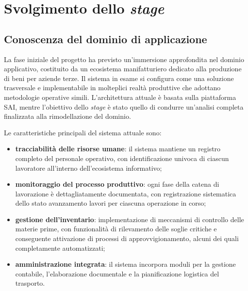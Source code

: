 \chapter{Svolgimento dello \textit{stage}}
    \section{Conoscenza del dominio di applicazione}
    La fase iniziale del progetto ha previsto un'immersione approfondita nel dominio applicativo, costituito da un ecosistema manifatturiero dedicato alla produzione di beni per aziende terze. Il sistema in esame si configura come una soluzione trasversale e implementabile in molteplici realtà produttive che adottano metodologie operative simili. L'architettura attuale è basata sulla piattaforma SAI, mentre l'obiettivo dello \textit{stage} è stato quello di condurre un'analisi completa finalizzata alla rimodellazione del dominio.

    \vspace{0.2 em}
    \noindent Le caratteristiche principali del sistema attuale sono:

    \begin{itemize}
        \item \textbf{tracciabilità delle risorse umane}: il sistema mantiene un registro completo del personale operativo, con identificazione univoca di ciascun lavoratore all'interno dell'ecosistema informativo;

        \item \textbf{monitoraggio del processo produttivo}: ogni fase della catena di lavorazione è dettagliatamente documentata, con registrazione sistematica dello stato avanzamento lavori per ciascuna operazione in corso;

        \item \textbf{gestione dell'inventario}: implementazione di meccanismi di controllo delle materie prime, con funzionalità di rilevamento delle soglie critiche e conseguente attivazione di processi di approvvigionamento, alcuni dei quali completamente automatizzati;

        \item \textbf{amministrazione integrata}: il sistema incorpora moduli per la gestione contabile, l'elaborazione documentale e la pianificazione logistica del trasporto.

    \end{itemize}
    
